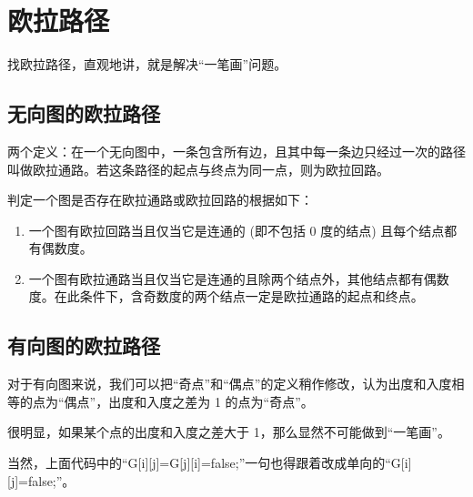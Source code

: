 \section{欧拉路径}
	找欧拉路径，直观地讲，就是解决“一笔画”问题。
	
	\subsection{无向图的欧拉路径}
		两个定义：在一个无向图中，一条包含所有边，且其中每一条边只经过一次的路径叫做欧拉通路。若这条路径的起点与终点为同一点，则为欧拉回路。
		
		判定一个图是否存在欧拉通路或欧拉回路的根据如下：
		
		\begin{enumerate}
			\item 一个图有欧拉回路当且仅当它是连通的 (即不包括 0 度的结点) 且每个结点都有偶数度。
			\item 一个图有欧拉通路当且仅当它是连通的且除两个结点外，其他结点都有偶数度。在此条件下，含奇数度的两个结点一定是欧拉通路的起点和终点。
		\end{enumerate}
		
		
		
	\subsection{有向图的欧拉路径}
		对于有向图来说，我们可以把“奇点”和“偶点”的定义稍作修改，认为出度和入度相等的点为“偶点”，出度和入度之差为 1 的点为“奇点”。
		
		很明显，如果某个点的出度和入度之差大于 1，那么显然不可能做到“一笔画”。
		
		当然，上面代码中的“G[i][j]=G[j][i]=false;”一句也得跟着改成单向的“G[i][j]=false;”。